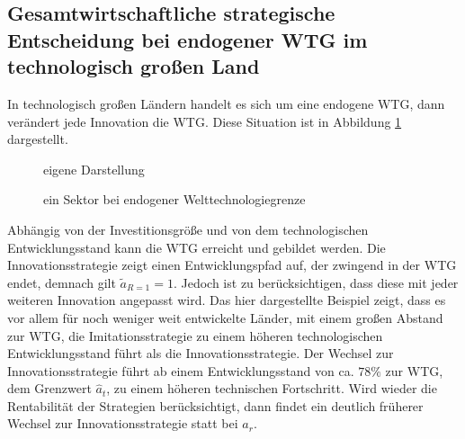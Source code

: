 \subsection{Gesamtwirtschaftliche strategische Entscheidung bei endogener WTG im technologisch großen Land}
In technologisch großen Ländern handelt es sich um eine endogene WTG, dann verändert jede Innovation die WTG. Diese Situation ist in Abbildung \ref{fig:ein Sektor endogene WTG} dargestellt.
%
		\begin{figure}[htb]
			\hfill{}  eigene Darstellung
			\caption{ein Sektor bei endogener Welttechnologiegrenze}
			\label{fig:ein Sektor endogene WTG}
		\end{figure}
%
Abhängig von der Investitionsgröße und von dem technologischen Entwicklungsstand kann die WTG erreicht und gebildet werden. Die Innovationsstrategie zeigt einen Entwicklungspfad auf, der zwingend in der WTG endet, demnach gilt $\tilde{a}_{R=1}=1$. Jedoch ist zu berücksichtigen, dass diese mit jeder weiteren Innovation angepasst wird. Das hier dargestellte Beispiel zeigt, dass es vor allem für noch weniger weit entwickelte Länder, mit einem großen Abstand zur WTG, die \textcolor[rgb]{0,0.32,0}{Imitationsstrategie} zu einem höheren technologischen Entwicklungsstand führt als die \textcolor[rgb]{0.74,0.97,0.22}{Innovationsstrategie}. Der Wechsel zur \textcolor[rgb]{0.74,0.97,0.22}{Innovationsstrategie} führt ab einem Entwicklungsstand von ca. $78\%$ zur WTG, dem Grenzwert $\hat{a}_t$, zu einem höheren technischen Fortschritt. Wird wieder die Rentabilität der Strategien berücksichtigt, dann findet ein deutlich früherer Wechsel zur Innovationsstrategie statt bei $a_r$.
%
